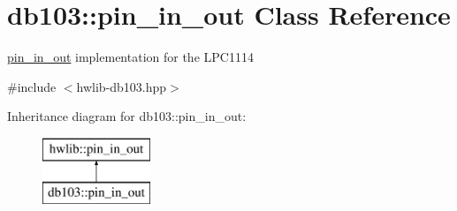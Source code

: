 \hypertarget{classdb103_1_1pin__in__out}{}\section{db103\+:\+:pin\+\_\+in\+\_\+out Class Reference}
\label{classdb103_1_1pin__in__out}


\hyperlink{classdb103_1_1pin__in__out}{pin\+\_\+in\+\_\+out} implementation for the L\+P\+C1114  




{\ttfamily \#include $<$hwlib-\/db103.\+hpp$>$}

Inheritance diagram for db103\+:\+:pin\+\_\+in\+\_\+out\+:\begin{figure}[H]
\begin{center}
\leavevmode
\includegraphics[height=2.000000cm]{classdb103_1_1pin__in__out}
\end{center}
\end{figure}
